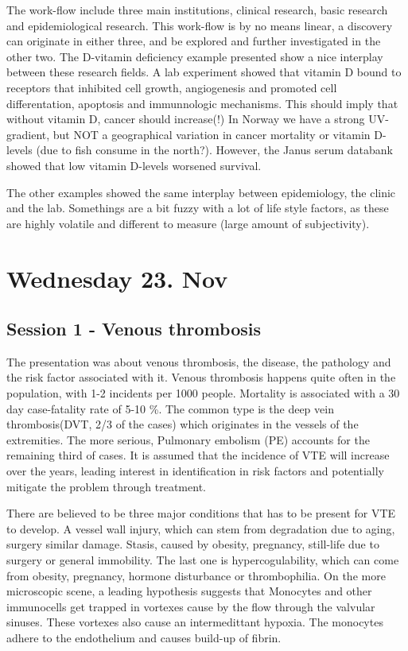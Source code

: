 \documentclass[12p]{article}
\begin{document}
The work-flow include three main institutions, clinical research, basic research and epidemiological research.
This work-flow is by no means linear, a discovery can originate in either three, and be explored and further investigated in the other two.
The D-vitamin deficiency example presented show a nice interplay between these research fields.
A lab experiment showed that vitamin D bound to receptors that inhibited cell growth, angiogenesis and promoted cell differentation, apoptosis and immunnologic mechanisms.
This should imply that without vitamin D, cancer should increase(!)
In Norway we have a strong UV-gradient, but NOT a geographical variation in cancer mortality or vitamin D-levels (due to fish consume in the north?).
However, the Janus serum databank showed that low vitamin D-levels worsened survival.

The other examples showed the same interplay between epidemiology, the clinic and the lab.
Somethings are a bit fuzzy with a lot of life style factors, as these are highly volatile and different to measure (large amount of subjectivity).

\section*{Wednesday 23. Nov}
\subsection*{Session 1 - Venous thrombosis}

The presentation was about venous thrombosis, the disease, the pathology and the risk factor associated with it.
Venous thrombosis happens quite often in the population, with 1-2 incidents per 1000 people.
Mortality is associated with a 30 day case-fatality rate of 5-10 \%.
The common type is the deep vein thrombosis(DVT, 2/3 of the cases) which originates in the vessels of the extremities.
The more serious, Pulmonary embolism (PE) accounts for the remaining third of cases.
It is assumed that the incidence of VTE will increase over the years, leading interest in identification in risk factors and potentially mitigate the problem through treatment.

There are believed to be three major conditions that has to be present for VTE to develop.
A vessel wall injury, which can stem from degradation due to aging, surgery similar damage.
Stasis, caused by obesity, pregnancy, still-life due to surgery or general immobility.
The last one is hypercogulability, which can come from obesity, pregnancy, hormone disturbance or thrombophilia.
On the more microscopic scene, a leading hypothesis suggests that Monocytes and other immunocells get trapped in vortexes cause by the flow through the valvular sinuses.
These vortexes also cause an intermedittant hypoxia.
The monocytes adhere to the endothelium and causes build-up of fibrin.
\end{document}
